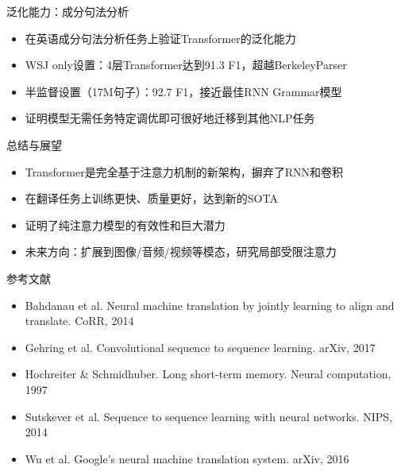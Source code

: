 \documentclass[aspectratio=169,12pt]{beamer}
\begin{document}
\begin{frame}{泛化能力：成分句法分析}


\begin{itemize}

    \item 在英语成分句法分析任务上验证Transformer的泛化能力

    \item WSJ only设置：4层Transformer达到91.3 F1，超越BerkeleyParser

    \item 半监督设置（17M句子）：92.7 F1，接近最佳RNN Grammar模型

    \item 证明模型无需任务特定调优即可很好地迁移到其他NLP任务

\end{itemize}


\end{frame}


\begin{frame}{总结与展望}


\begin{itemize}

    \item Transformer是完全基于注意力机制的新架构，摒弃了RNN和卷积

    \item 在翻译任务上训练更快、质量更好，达到新的SOTA

    \item 证明了纯注意力模型的有效性和巨大潜力

    \item 未来方向：扩展到图像/音频/视频等模态，研究局部受限注意力

\end{itemize}


\end{frame}


\begin{frame}{参考文献}


\begin{itemize}

    \item [2] Bahdanau et al. Neural machine translation by jointly learning to align and translate. CoRR, 2014

    \item [9] Gehring et al. Convolutional sequence to sequence learning. arXiv, 2017

    \item [13] Hochreiter \& Schmidhuber. Long short-term memory. Neural computation, 1997

    \item [35] Sutskever et al. Sequence to sequence learning with neural networks. NIPS, 2014

    \item [38] Wu et al. Google's neural machine translation system. arXiv, 2016

\end{itemize}


\end{frame}
\end{document}
